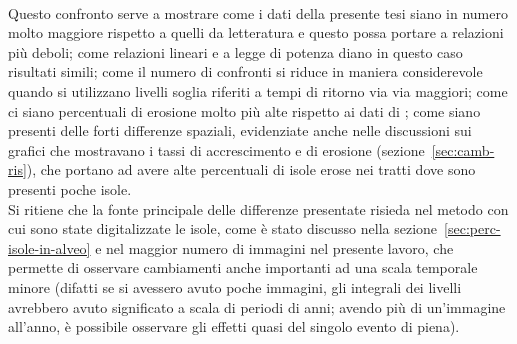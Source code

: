 %
\\
Questo confronto serve a mostrare come i dati della presente tesi siano in numero molto maggiore rispetto a quelli da letteratura e questo possa portare a relazioni più deboli;
come relazioni lineari e a legge di potenza diano in questo caso risultati simili;
come il numero di confronti si riduce in maniera considerevole quando si utilizzano livelli soglia riferiti a tempi di ritorno via via maggiori;
come ci siano percentuali di erosione molto più alte rispetto ai dati di ;
come siano presenti delle forti differenze spaziali, evidenziate anche nelle discussioni sui grafici che mostravano i tassi di accrescimento e di erosione (sezione~\ref{sec:camb-ris}), che portano ad avere alte percentuali di isole erose nei tratti dove sono presenti poche isole.
\\
Si ritiene che la fonte principale delle differenze presentate risieda nel metodo con cui sono state digitalizzate le isole, come è stato discusso nella sezione~\ref{sec:perc-isole-in-alveo} e nel maggior numero di immagini nel presente lavoro, che permette di osservare cambiamenti anche importanti ad una scala temporale minore (difatti se si avessero avuto poche immagini, gli integrali dei livelli avrebbero avuto significato a scala di periodi di anni; avendo più di un'immagine all'anno, è possibile osservare gli effetti quasi del singolo evento di piena).




